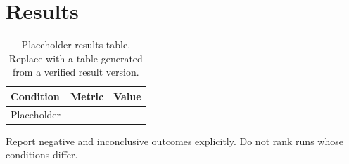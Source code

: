 \section{Results}
\label{sec:results}

\begin{table}[h]
\centering
\caption{Placeholder results table. Replace with a table generated from a verified result version.}
\label{tab:results}
\begin{tabular}{lcc}
\toprule
Condition & Metric & Value \\
\midrule
Placeholder & -- & -- \\
\bottomrule
\end{tabular}
\end{table}

Report negative and inconclusive outcomes explicitly. Do not rank runs whose conditions differ.
